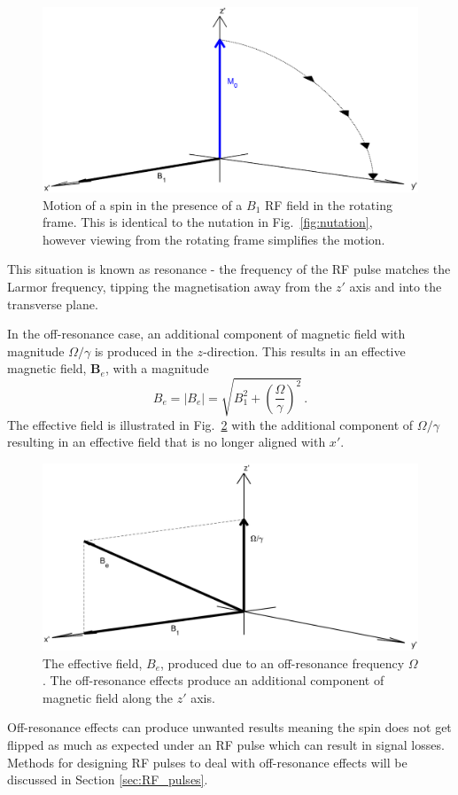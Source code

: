 \begin{figure}
	\centering
	\includegraphics[width=\textwidth]{figures/background/nutation_onres.eps}
	\caption{Motion of a spin in the presence of a $B_1$ RF field in the rotating frame. This is identical to the nutation in Fig.\ \ref{fig:nutation}, however viewing from the rotating frame simplifies the motion. }
	\label{fig:onres}
\end{figure}

This situation is known as resonance - the frequency of the \ac{RF} pulse matches the Larmor frequency, tipping the magnetisation away from the $z'$ axis and into the transverse plane. 

In the off-resonance case, an additional component of magnetic field with magnitude $\Omega/\gamma$ is produced in the $z$-direction.
This results in an effective magnetic field, $\mathbf{B}_e$, with a magnitude \cite{DeGraaf2007}
\begin{equation}
	B_e = |B_e| = \sqrt{B_1^2 + \left(\frac{\Omega}{\gamma}\right)^2}\,.
	\label{eq:Beff}
\end{equation}
The effective field is illustrated in Fig.\ \ref{fig:B_e} with the additional component of $\Omega/\gamma$ resulting in an effective field that is no longer aligned with $x'$.
\begin{figure}
	\centering
	\includegraphics[width=\textwidth]{figures/background/B_e.eps}
	\caption{The effective field, $B_e$, produced due to an off-resonance frequency $\Omega$. The off-resonance effects produce an additional component of magnetic field along the $z'$ axis.}
	\label{fig:B_e}	
\end{figure}
Off-resonance effects can produce unwanted results meaning the spin does not get flipped as much as expected under an \ac{RF} pulse which can result in signal losses. 
Methods for designing \ac{RF} pulses to deal with off-resonance effects will be discussed in Section \ref{sec:RF_pulses}. 


